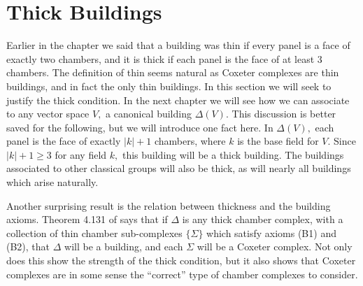 \documentclass[class=book, crop=false,12 pt]{standalone}
\begin{document}
\section{Thick Buildings}
Earlier in the chapter we said that a building was thin if every panel is a face of exactly two chambers, and it is thick if each panel is the face of at least 3 chambers. The definition of thin seems natural as Coxeter complexes are thin buildings, and in fact the only thin buildings. In this section we will seek to justify the thick condition. In the next chapter we will see how we can associate to any vector space $V,$ a canonical building $\Delta(V).$ This discussion is better saved for the following, but we will introduce one fact here. In $\Delta(V),$ each panel is the face of exactly $|k|+1$ chambers, where $k$ is the base field for $V.$ Since $|k|+1\ge 3$ for any field $k,$ this building will be a thick building. The buildings associated to other classical groups will also be thick, as will nearly all buildings which arise naturally.

Another surprising result is the relation between thickness and the building axioms. Theorem 4.131 of \cite{buildings} says that if $\Delta$ is any thick chamber complex, with a collection of thin chamber sub-complexes $\{\Sigma\}$ which satisfy axioms (B1) and (B2), that $\Delta$ will be a building, and each $\Sigma$ will be a Coxeter complex. Not only does this show the strength of the thick condition, but it also shows that Coxeter complexes are in some sense the ``correct'' type of chamber complexes to consider.
\end{document}
